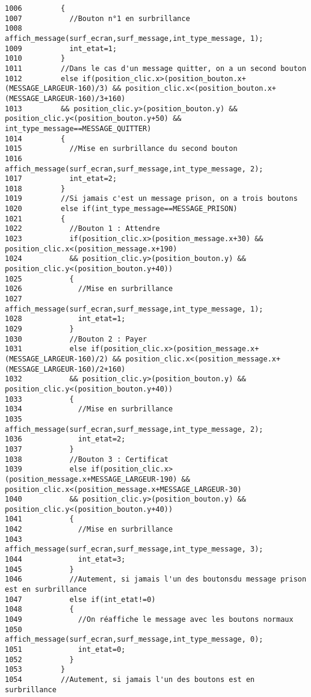 \begin{Code}
\begin{verbatim}
1006         {
1007           //Bouton n°1 en surbrillance
1008           affich_message(surf_ecran,surf_message,int_type_message, 1);
1009           int_etat=1;
1010         }
1011         //Dans le cas d'un message quitter, on a un second bouton
1012         else if(position_clic.x>(position_bouton.x+(MESSAGE_LARGEUR-160)/3) && position_clic.x<(position_bouton.x+(MESSAGE_LARGEUR-160)/3+160)
1013         && position_clic.y>(position_bouton.y) && position_clic.y<(position_bouton.y+50) && int_type_message==MESSAGE_QUITTER)
1014         {
1015           //Mise en surbrillance du second bouton
1016           affich_message(surf_ecran,surf_message,int_type_message, 2);
1017           int_etat=2;
1018         }
1019         //Si jamais c'est un message prison, on a trois boutons
1020         else if(int_type_message==MESSAGE_PRISON)
1021         {
1022           //Bouton 1 : Attendre
1023           if(position_clic.x>(position_message.x+30) && position_clic.x<(position_message.x+190)
1024           && position_clic.y>(position_bouton.y) && position_clic.y<(position_bouton.y+40))
1025           {
1026             //Mise en surbrillance
1027             affich_message(surf_ecran,surf_message,int_type_message, 1);
1028             int_etat=1;
1029           }
1030           //Bouton 2 : Payer
1031           else if(position_clic.x>(position_message.x+(MESSAGE_LARGEUR-160)/2) && position_clic.x<(position_message.x+(MESSAGE_LARGEUR-160)/2+160)
1032           && position_clic.y>(position_bouton.y) && position_clic.y<(position_bouton.y+40))
1033           {
1034             //Mise en surbrillance
1035             affich_message(surf_ecran,surf_message,int_type_message, 2);
1036             int_etat=2;
1037           }
1038           //Bouton 3 : Certificat
1039           else if(position_clic.x>(position_message.x+MESSAGE_LARGEUR-190) && position_clic.x<(position_message.x+MESSAGE_LARGEUR-30)
1040           && position_clic.y>(position_bouton.y) && position_clic.y<(position_bouton.y+40))
1041           {
1042             //Mise en surbrillance
1043             affich_message(surf_ecran,surf_message,int_type_message, 3);
1044             int_etat=3;
1045           }
1046           //Autement, si jamais l'un des boutonsdu message prison est en surbrillance
1047           else if(int_etat!=0)
1048           {
1049             //On réaffiche le message avec les boutons normaux
1050             affich_message(surf_ecran,surf_message,int_type_message, 0);
1051             int_etat=0;
1052           }
1053         }
1054         //Autement, si jamais l'un des boutons est en surbrillance

\end{verbatim}
\end{Code}
